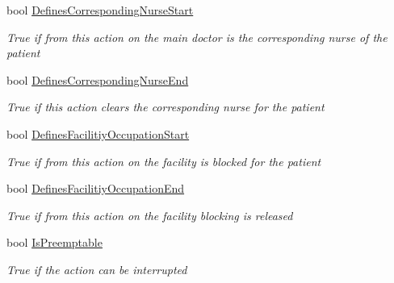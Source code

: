 \begin{DoxyCompactItemize}
bool \hyperlink{class_general_health_care_elements_1_1_general_classes_1_1_action_types_and_paths_1_1_action_type_class_acac7536b9438c790ab6d4e86b55c4bd4}{Defines\+Corresponding\+Nurse\+Start}
\begin{DoxyCompactList}\small\item\em True if from this action on the main doctor is the corresponding nurse of the patient \end{DoxyCompactList}\item 
bool \hyperlink{class_general_health_care_elements_1_1_general_classes_1_1_action_types_and_paths_1_1_action_type_class_a7a6a4a5903379718e8d1b91eb5d1880f}{Defines\+Corresponding\+Nurse\+End}
\begin{DoxyCompactList}\small\item\em True if this action clears the corresponding nurse for the patient \end{DoxyCompactList}\item 
bool \hyperlink{class_general_health_care_elements_1_1_general_classes_1_1_action_types_and_paths_1_1_action_type_class_a59f1669b15c20d7d0b2f9b626a5ae54a}{Defines\+Facilitiy\+Occupation\+Start}
\begin{DoxyCompactList}\small\item\em True if from this action on the facility is blocked for the patient \end{DoxyCompactList}\item 
bool \hyperlink{class_general_health_care_elements_1_1_general_classes_1_1_action_types_and_paths_1_1_action_type_class_aeb35161be03b5138b428d3782420a522}{Defines\+Facilitiy\+Occupation\+End}
\begin{DoxyCompactList}\small\item\em True if from this action on the facility blocking is released \end{DoxyCompactList}\item 
bool \hyperlink{class_general_health_care_elements_1_1_general_classes_1_1_action_types_and_paths_1_1_action_type_class_a400cc87b19f9b7c64aad2ac305469776}{Is\+Preemptable}
\begin{DoxyCompactList}\small\item\em True if the action can be interrupted \end{DoxyCompactList}\item 

\end{DoxyCompactItemize}
